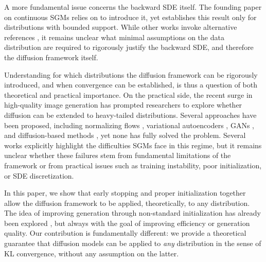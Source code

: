 A more fundamental issue concerns the backward SDE itself. The founding paper on continuous SGMs \citep{song2021scorebased} relies on \citep{anderson1982reverse} to introduce it, yet \citep{anderson1982reverse} establishes this result only for distributions with bounded support. While other works \citep{bortoli2021diffusion} invoke alternative references \citep{haussmann1986time}, it remains unclear what minimal assumptions on the data distribution are required to rigorously justify the backward SDE, and therefore the diffusion framework itself.

Understanding for which distributions the diffusion framework can be rigorously introduced, and when convergence can be established, is thus a question of both theoretical and practical importance. On the practical side, the recent surge in high-quality image generation has prompted researchers to explore whether diffusion can be extended to heavy-tailed distributions. Several approaches have been proposed, including normalizing flows \citep{hickling2025flexibletails, mcdonald2022cometflows, laszkiewicz2022marginal}, variational autoencoders \citep{lafon2023vae}, GANs \citep{allouche2022evgan, huster2021pareto}, and diffusion-based methods \citep{pandey2025heavytailed, yoon2023levy, shariatian2025heavy}, yet none has fully solved the problem. Several works \citep{pandey2025heavytailed, shariatian2025heavy} explicitly highlight the difficulties SGMs face in this regime, but it remains unclear whether these failures stem from fundamental limitations of the framework or from practical issues such as training instability, poor initialization, or SDE discretization.

In this paper, we show that early stopping and proper initialization together allow the diffusion framework to be applied, theoretically, to any distribution. The idea of improving generation through non-standard initialization has already been explored \citep{zheng2023truncated, zand2024diffusion, DBLP:journals/corr/abs-2306-12360, lee2022priorgrad, shen2025information, scholz2026warm}, but always with the goal of improving efficiency or generation quality. Our contribution is fundamentally different: we provide a theoretical guarantee that diffusion models can be applied to \textit{any} distribution in the sense of KL convergence, without any assumption on the latter.

